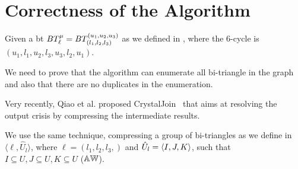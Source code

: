       
\clearpage
\section{Correctness of the Algorithm}
Given a \acrshort{bt} $BT_{\ell}^{\mu} = BT_{(l_1, l_2,l_3)}^{(u_1, u_2, u_3)}$ as we defined in , where the 6-cycle is $(u_1,l_1,u_2,l_3,u_3,l_2,u_1)$.


We need to prove that the algorithm can enumerate all bi-triangle in the graph and also that there are no duplicates in the enumeration.

Very recently, Qiao et al. proposed CrystalJoin~\cite{Lai} that aims at resolving the output crisis by compressing the intermediate results.

We use the same technique, compressing a group of bi-triangles as we define in  $\langle \ell, \hat{U}_l\rangle$, where $\ell = (l_1,l_2,l_3,)$ and $\hat{U}_l= \left\langle I, J, K\right\rangle$, such that $I \subseteq U, J \subseteq U, K \subseteq U$ ($\mathbb{AW}$).
 

